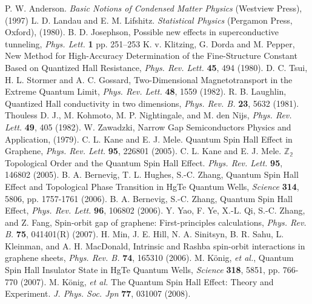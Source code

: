 \documentclass[titlepage,a4paper]{book}
\begin{document}
\begin{thebibliography}{99}
P. W. Anderson. \textit{Basic Notions of Condensed Matter Physics} (Westview Press), (1997)
L. D. Landau and E. M. Lifshitz. \textit{Statistical Physics} (Pergamon Press, Oxford), (1980).
B. D. Josephson, Possible new effects in superconductive tunneling, \textit{Phys. Lett.} \textbf{1} pp. 251–253 
K. v. Klitzing, G. Dorda and M. Pepper, New Method for High-Accuracy Determination of the Fine-Structure Constant Based on Quantized Hall Resistance, \textit{Phys. Rev. Lett.} \textbf{45}, 494 (1980).
D. C. Tsui, H. L. Stormer and A. C. Gossard, Two-Dimensional Magnetotransport in the Extreme Quantum Limit, \textit{Phys. Rev. Lett.} \textbf{48}, 1559 (1982).
R. B. Laughlin, Quantized Hall conductivity in two dimensions, \textit{Phys. Rev. B.} \textbf{23}, 5632 (1981).
Thouless D. J., M. Kohmoto, M. P. Nightingale, and M. den Nijs, \textit{Phys. Rev. Lett.} \textbf{49}, 405 (1982).
W. Zawadzki, Narrow Gap Semiconductors Physics and Application, (1979).
C. L. Kane and E. J. Mele. Quantum Spin Hall Effect in Graphene, \textit{Phys. Rev. Lett.} \textbf{95}, 226801 (2005).
C. L. Kane and E. J. Mele. $\mathbb{Z_2}$ Topological Order and the Quantum Spin Hall Effect. \textit{Phys. Rev. Lett.} \textbf{95}, 146802 (2005).
B. A. Bernevig, T. L. Hughes, S.-C. Zhang, Quantum Spin Hall Effect and Topological Phase Transition in HgTe Quantum Wells, \textit{Science} \textbf{314}, 5806, pp. 1757-1761 (2006).
B. A. Bernevig, S.-C. Zhang, Quantum Spin Hall Effect, \textit{Phys. Rev. Lett.} \textbf{96}, 106802 (2006).
Y. Yao, F. Ye, X.-L. Qi, S.-C. Zhang, and Z. Fang, Spin-orbit gap of graphene: First-principles calculations, \textit{Phys. Rev. B.} \textbf{75}, 041401(R) (2007).
H. Min, J. E. Hill, N. A. Sinitsyn, B. R. Sahu, L. Kleinman, and A. H. MacDonald, Intrinsic and Rashba spin-orbit interactions in graphene sheets, \textit{Phys. Rev. B.} \textbf{74}, 165310 (2006).
M. König, \textit{et al.}, Quantum Spin Hall Insulator State in HgTe Quantum Wells, \textit{Science} \textbf{318}, 5851, pp. 766-770 (2007).
M. König, \textit{et al.} The Quantum Spin Hall Effect: Theory and Experiment. \textit{J. Phys. Soc. Jpn} \textbf{77}, 031007 (2008).

\end{thebibliography}
\end{document}
